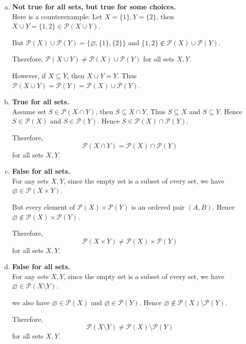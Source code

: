 \begin{mysolution}
    \begin{enumerate}[(a)]
    \item \textbf{Not true for all sets, but true for some choices.}\\
    Here is a counterexample: Let $X=\{1\}, Y=\{2\}$, then $X \cup Y = \{1,2\} \in \mathcal{P}(X \cup Y)$.
    
    But $\mathcal{P}(X) \cup \mathcal{P}(Y) = \{\varnothing, \{1\}, \{2\}\}$ and $\{1,2\} \notin \mathcal{P}(X) \cup \mathcal{P}(Y)$. 
    
    Therefore, $\mathcal{P}(X \cup Y) \ne \mathcal{P}(X) \cup \mathcal{P}(Y)$ for all sets $X, Y$.

    However, if $X \subseteq Y$, then $X \cup Y = Y$. Thus 
    $\mathcal{P}(X \cup Y) = \mathcal{P}(Y) = \mathcal{P}(X) \cup \mathcal{P}(Y)$.
    \item \textbf{True for all sets.}\\
    Assume set $S \in \mathcal{P}(X \cap Y)$, then $S \subseteq X \cap Y$. Thus $S \subseteq X$ and $S \subseteq Y$. Hence $S \in \mathcal{P}(X)$ and $S \in \mathcal{P}(Y)$. Hence $S \in \mathcal{P}(X) \cap \mathcal{P}(Y)$. 
    
    Therefore,
    \[\mathcal{P}(X \cap Y) = \mathcal{P}(X) \cap \mathcal{P}(Y)\]
    for all sets $X, Y$.
    \item \textbf{False for all sets.}\\
    For any sets $X,Y$, since the empty set is a subset of every set, we have $\varnothing \in \mathcal{P}(X \times Y)$. 
    
    But every element of $\mathcal{P}(X) \times \mathcal{P}(Y)$ is an ordered pair $(A,B)$. Hence $\varnothing \notin \mathcal{P}(X) \times \mathcal{P}(Y)$. 
    
    Therefore, 
    \[\mathcal{P}(X \times Y) \ne \mathcal{P}(X) \times \mathcal{P}(Y)\]
    for all sets $X, Y$.
    \item \textbf{False for all sets.}\\
    For any sets $X,Y$, since the empty set is a subset of every set, we have $\varnothing \in \mathcal{P}(X \setminus Y)$.

    we also have $\varnothing \in \mathcal{P}(X)$ and $\varnothing \in \mathcal{P}(Y)$. Hence $\varnothing \notin \mathcal{P}(X) \setminus \mathcal{P}(Y)$.
    
    Therefore, 
    \[\mathcal{P}(X \setminus Y) \ne \mathcal{P}(X) \setminus \mathcal{P}(Y)\]
    for all sets $X, Y$.
    \end{enumerate}
\end{mysolution}

